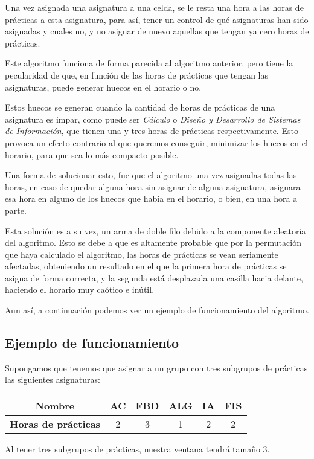Una vez asignada una asignatura a una celda, se le resta una hora a las horas de prácticas a esta asignatura, para así, tener un control de qué asignaturas han sido asignadas y cuales no, y no asignar de nuevo aquellas que tengan ya cero horas de prácticas.

Este algoritmo funciona de forma parecida al algoritmo anterior, pero tiene la pecularidad de que, en función de las horas de prácticas que tengan las asignaturas, puede generar huecos en el horario o no. 

Estos huecos se generan cuando la cantidad de horas de prácticas de una asignatura es impar, como puede ser \textit{Cálculo} o \textit{Diseño y Desarrollo de Sistemas de Información}, que tienen una y tres horas de prácticas respectivamente. Esto provoca un efecto contrario al que queremos conseguir, minimizar los huecos en el horario, para que sea lo más compacto posible. 

Una forma de solucionar esto, fue que el algoritmo una vez asignadas todas las horas, en caso de quedar alguna hora sin asignar de alguna asignatura, asignara esa hora en alguno de los huecos que había en el horario, o bien, en una hora a parte. 

Esta solución es a su vez, un arma de doble filo debido a la componente aleatoria del algoritmo. Esto se debe a que es altamente probable que por la permutación que haya calculado el algoritmo, las horas de prácticas se vean seriamente afectadas, obteniendo un resultado en el que la primera hora de prácticas se asigna de forma correcta, y la segunda está desplazada una casilla hacia delante, haciendo el horario muy caótico e inútil.

Aun así, a continuación podemos ver un ejemplo de funcionamiento del algoritmo. 

\subsection{Ejemplo de funcionamiento}

Supongamos que tenemos que asignar a un grupo con tres subgrupos de prácticas las siguientes asignaturas:

\begin{tabular}{c | c  c  c  c  c}
\textbf{Nombre} & AC & FBD & ALG & IA & FIS \\
\hline
\textbf{Horas de prácticas}  & 2 & 3 & 1 & 2 & 2 \\
\end{tabular}

Al tener tres subgrupos de prácticas, nuestra ventana tendrá tamaño 3. 

